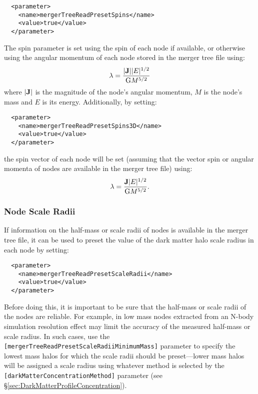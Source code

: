 \begin{verbatim}
  <parameter>
    <name>mergerTreeReadPresetSpins</name>
    <value>true</value>
  </parameter>
\end{verbatim}

The spin parameter is set using the spin of each node if available, or otherwise using the angular momentum of each node stored in the merger tree file using:
\begin{equation}
 \lambda = {|{\bf J}| |E|^{1/2} \over {\rm G} M^{5/2}}
\end{equation}
where $|{\bf J}|$ is the magnitude of the node's angular momentum, $M$ is the node's mass and $E$ is its energy. Additionally, by setting:

\begin{verbatim}
  <parameter>
    <name>mergerTreeReadPresetSpins3D</name>
    <value>true</value>
  </parameter>
\end{verbatim}
the spin vector of each node will be set (assuming that the vector spin or angular momenta of nodes are available in the merger tree file) using:
\begin{equation}
 {\boldmath \lambda} = {{\bf J} |E|^{1/2} \over {\rm G} M^{5/2}}.
\end{equation}

\subsubsection{Node Scale Radii}

If information on the half-mass or scale radii of nodes is available in the merger tree file, it can be used to preset the value of the dark matter halo scale radius in each node by setting:

\begin{verbatim}
  <parameter>
    <name>mergerTreeReadPresetScaleRadii</name>
    <value>true</value>
  </parameter>
\end{verbatim}

Before doing this, it is important to be sure that the half-mass or scale radii of the nodes are reliable. For example, in low mass nodes extracted from an N-body simulation resolution effect may limit the accuracy of the measured half-mass or scale radius. In such cases, use the {\tt [mergerTreeReadPresetScaleRadiiMinimumMass]} parameter to specify the lowest mass halos for which the scale radii should be preset---lower mass halos will be assigned a scale radius using whatever method is selected by the {\tt [darkMatterConcentrationMethod]} parameter (see \S\ref{sec:DarkMatterProfileConcentration}).

